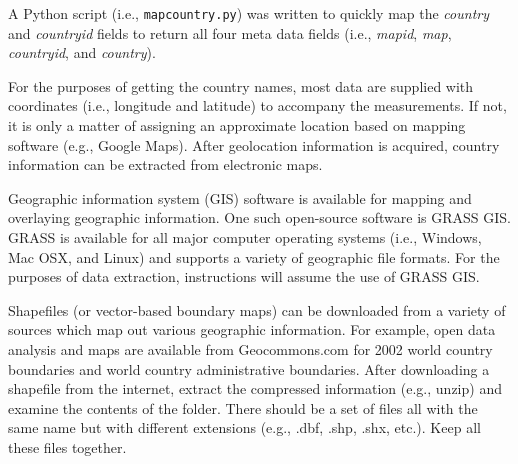 A Python script (i.e., \texttt{map\textunderscore country.py}) was written to quickly map the \emph{country} and \emph{countryid} fields to return all four meta data fields (i.e., \emph{mapid}, \emph{map}, \emph{countryid}, and \emph{country}).

For the purposes of getting the country names, most data are supplied with coordinates (i.e., longitude and latitude) to accompany the measurements.  
If not, it is only a matter of assigning an approximate location based on mapping software (e.g., Google Maps\footnotemark {}).  
After geolocation information is acquired, country information can be extracted from electronic maps.

Geographic information system (GIS) software is available for mapping and overlaying geographic information. One such open-source software is GRASS GIS\footnotemark.  
GRASS is available for all major computer operating systems (i.e., Windows, Mac OSX, and Linux) and supports a variety of geographic file formats.  
For the purposes of data extraction, instructions will assume the use of GRASS GIS.

Shapefiles (or vector-based boundary maps) can be downloaded from a variety of sources which map out various geographic information.  
For example, open data analysis and maps are available from Geocommons.com for 2002 world country boundaries\footnotemark {} and world country administrative boundaries\footnotemark.   
After downloading a shapefile from the internet, extract the compressed information (e.g., unzip) and examine the contents of the folder.  
There should be a set of files all with the same name but with different extensions (e.g., .dbf, .shp, .shx, etc.).  
Keep all these files together.

